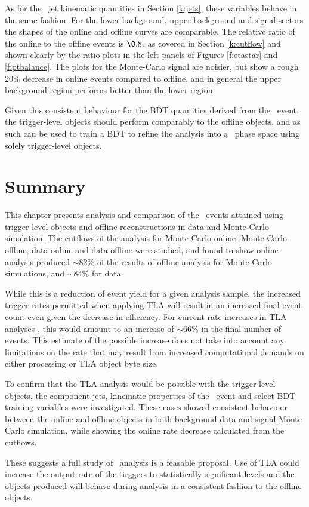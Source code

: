     As for the \VBFHBB\ jet kinematic quantities in Section \ref{k:jets}, these variables behave in the same fashion. For the lower background, upper background and signal sectors the shapes of the online and offline curves are comparable. The relative ratio of the online to the offline events is $\0.8$, as covered in Section \ref{k:cutflow} and shown clearly by the ratio plots in the left panels of Figures \ref{f:etastar} and \ref{f:ptbalance}. The plots for the Monte-Carlo signal are noisier, but show a rough $20\%$ decrease in online events compared to offline, and in general the upper background region performs better than the lower region.

    Given this consistent behaviour for the BDT quantities derived from the \VBFHBB\ event, the trigger-level objects should perform comparably to the offline objects, and as such can be used to train a BDT to refine the analysis into a \VBFHBB\ phase space using solely trigger-level objects.

    \section{Summary}

    This chapter presents analysis and comparison of the \VBFHBB\ events attained using trigger-level objects and offline reconstructions in data and Monte-Carlo simulation. The cutflows of the analysis for Monte-Carlo online, Monte-Carlo offline, data online and data offline were studied, and found to show online analysis produced $\sim82\%$ of the results of offline analysis for Monte-Carlo simulations, and $\sim84\%$ for data.

    While this is a reduction of event yield for a given analysis sample, the increased trigger rates permitted when applying TLA will result in an increased final event count even given the decrease in efficiency. For current rate increases in TLA analyses \cite{tla}, this would amount to an increase of $\sim66\%$ in the final number of events. This estimate of the possible increase does not take into account any limitations on the rate that may result from increased computational demands on either processing or TLA object byte size.

    To confirm that the TLA analysis would be possible with the trigger-level objects, the component jets, kinematic properties of the \VBFHBB\ event and select BDT training variables were investigated. These cases showed consistent behaviour between the online and offline objects in both background data and signal Monte-Carlo simulation, while showing the online rate decrease calculated from the cutflows.

    These suggests a full study of \VBFHBB\ analysis is a feasable proposal. Use of TLA could increase the output rate of the tirggers to statistically significant levels and the objects produced will behave during analysis in a consistent fashion to the offline objects.
\endinput
